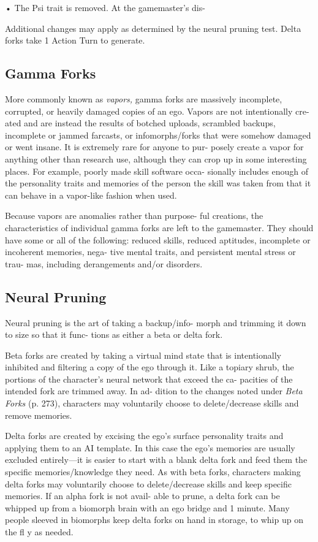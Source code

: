 •  The Psi trait is removed. At the gamemaster's dis-

Additional changes may apply as determined by the 
neural pruning test. Delta forks take 1 Action Turn 
to generate.

\subsection{Gamma Forks}

More commonly known as \textit{vapors,} gamma forks are 
massively incomplete, corrupted, or heavily damaged 
copies of an ego. Vapors are not intentionally cre-
ated and are instead the results of botched uploads, 
scrambled backups, incomplete or jammed farcasts, 
or infomorphs/forks that were somehow damaged or 
went insane. It is extremely rare for anyone to pur-
posely create a vapor for anything other than research 
use, although they can crop up in some interesting 
places. For example, poorly made skill software occa-
sionally includes enough of the personality traits and 
memories of the person the skill was taken from that 
it can behave in a vapor-like fashion when used.

Because vapors are anomalies rather than purpose-
ful creations, the characteristics of individual gamma 
forks are left to the gamemaster. They should have 
some or all of the following: reduced skills, reduced 
aptitudes, incomplete or incoherent memories, nega-
tive mental traits, and persistent mental stress or trau-
mas, including derangements and/or disorders.

\subsection{Neural Pruning}

Neural pruning is the art of taking a backup/info-
morph and trimming it down to size so that it func-
tions as either a beta or delta fork.

Beta forks are created by taking a virtual mind state 
that is intentionally inhibited and filtering a copy of 
the ego through it. Like a topiary shrub, the portions 
of the character's neural network that exceed the ca-
pacities of the intended fork are trimmed away. In ad-
dition to the changes noted under \textit{Beta Forks} (p. 273), 
characters may voluntarily choose to delete/decrease 
skills and remove memories.

Delta forks are created by excising the ego's surface 
personality traits and applying them to an AI template. 
In this case the ego's memories are usually excluded 
entirely—it is easier to start with a blank delta fork 
and feed them the specific memories/knowledge they 
need. As with beta forks, characters making delta forks 
may voluntarily choose to delete/decrease skills and 
keep specific memories. If an alpha fork is not avail-
able to prune, a delta fork can be whipped up from 
a biomorph brain with an ego bridge and 1 minute. 
Many people sleeved in biomorphs keep delta forks on 
hand in storage, to whip up on the fl y as needed.

